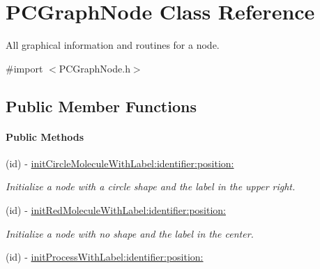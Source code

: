 \hypertarget{interface_p_c_graph_node}{
\section{PCGraphNode Class Reference}
\label{interface_p_c_graph_node}
}


All graphical information and routines for a node.  




{\ttfamily \#import $<$PCGraphNode.h$>$}

\subsection*{Public Member Functions}
\begin{Indent}\paragraph*{Public Methods}
\begin{DoxyCompactItemize}
\item 
\hypertarget{interface_p_c_graph_node_a26945b7c2faba79bfacbd9fc73d79768}{
(id) -\/ \hyperlink{interface_p_c_graph_node_a26945b7c2faba79bfacbd9fc73d79768}{initCircleMoleculeWithLabel:identifier:position:}}
\label{interface_p_c_graph_node_a26945b7c2faba79bfacbd9fc73d79768}

\begin{DoxyCompactList}\small\item\em Initialize a node with a circle shape and the label in the upper right. \end{DoxyCompactList}\item 
\hypertarget{interface_p_c_graph_node_a012e646ff8ebc8ee4de1c6d5c36118dc}{
(id) -\/ \hyperlink{interface_p_c_graph_node_a012e646ff8ebc8ee4de1c6d5c36118dc}{initRedMoleculeWithLabel:identifier:position:}}
\label{interface_p_c_graph_node_a012e646ff8ebc8ee4de1c6d5c36118dc}

\begin{DoxyCompactList}\small\item\em Initialize a node with no shape and the label in the center. \end{DoxyCompactList}\item 
\hypertarget{interface_p_c_graph_node_a9e5dc574282c70393b29ea5addb0b482}{
(id) -\/ \hyperlink{interface_p_c_graph_node_a9e5dc574282c70393b29ea5addb0b482}{initProcessWithLabel:identifier:position:}}
\label{interface_p_c_graph_node_a9e5dc574282c70393b29ea5addb0b482}


\end{DoxyCompactItemize}
\end{Indent}
